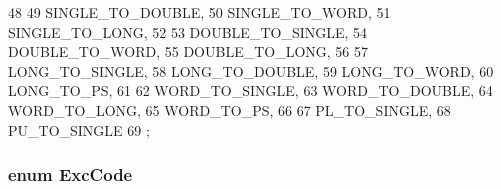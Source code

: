 \begin{DoxyCode}
48                 {
49     SINGLE_TO_DOUBLE,
50     SINGLE_TO_WORD,
51     SINGLE_TO_LONG,
52 
53     DOUBLE_TO_SINGLE,
54     DOUBLE_TO_WORD,
55     DOUBLE_TO_LONG,
56 
57     LONG_TO_SINGLE,
58     LONG_TO_DOUBLE,
59     LONG_TO_WORD,
60     LONG_TO_PS,
61 
62     WORD_TO_SINGLE,
63     WORD_TO_DOUBLE,
64     WORD_TO_LONG,
65     WORD_TO_PS,
66 
67     PL_TO_SINGLE,
68     PU_TO_SINGLE
69 };
\end{DoxyCode}
\hypertarget{namespaceMipsISA_abcc8a7c57cd8becefbfd621dbff5ffd4}{
\subsubsection[{ExcCode}]{\setlength{\rightskip}{0pt plus 5cm}enum {\bf ExcCode}}}
\label{namespaceMipsISA_abcc8a7c57cd8becefbfd621dbff5ffd4}
